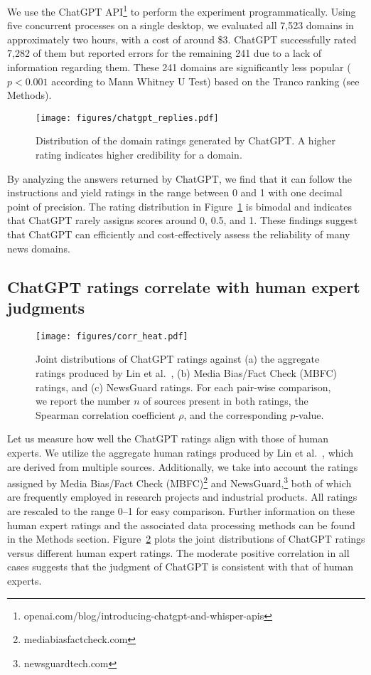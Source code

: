 \documentclass{article}
\begin{document}
We use the ChatGPT API\footnote{openai.com/blog/introducing-chatgpt-and-whisper-apis} to perform the experiment programmatically.
Using five concurrent processes on a single desktop, we evaluated all 7,523 domains in approximately two hours, with a cost of around \$3.
ChatGPT successfully rated 7,282 of them but reported errors for the remaining 241 due to a lack of information regarding them.
These 241 domains are significantly less popular ($p<0.001$ according to Mann Whitney U Test) based on the Tranco ranking (see Methods).

\begin{figure}
    \centering
    \texttt{[image: figures/chatgpt\_replies.pdf]}
    \caption{
    Distribution of the domain ratings generated by ChatGPT.
    A higher rating indicates higher credibility for a domain.
    }
    \label{fig:chatgpt_replies}
\end{figure}

By analyzing the answers returned by ChatGPT, we find that it can follow the instructions and yield ratings in the range between 0 and 1 with one decimal point of precision.
The rating distribution in Figure~\ref{fig:chatgpt_replies} is bimodal and indicates that ChatGPT rarely assigns scores around 0, 0.5, and 1.
These findings suggest that ChatGPT can efficiently and cost-effectively assess the reliability of many news domains.

\subsection{ChatGPT ratings correlate with human expert judgments}

\begin{figure}
    \centering
    \texttt{[image: figures/corr\_heat.pdf]}
    \caption{
    Joint distributions of ChatGPT ratings against (a) the aggregate ratings produced by Lin et al.~\cite{lin2022high}, (b) Media Bias/Fact Check (MBFC) ratings, and (c) NewsGuard ratings.
    For each pair-wise comparison, we report the number $n$ of sources present in both ratings, the Spearman correlation coefficient $\rho$, and the corresponding $p$-value.
    }
    \label{fig:corr_heat}
\end{figure}

Let us measure how well the ChatGPT ratings align with those of human experts.
We utilize the aggregate human ratings produced by Lin et al.~\cite{lin2022high}, which are derived from multiple sources.
Additionally, we take into account the ratings assigned by Media Bias/Fact Check (MBFC)\footnote{mediabiasfactcheck.com} and NewsGuard,\footnote{newsguardtech.com} both of which are frequently employed in research projects and industrial products. 
All ratings are rescaled to the range 0--1 for easy comparison.
Further information on these human expert ratings and the associated data processing methods can be found in the Methods section. 
Figure~\ref{fig:corr_heat} plots the joint distributions of ChatGPT ratings versus different human expert ratings.
The moderate positive correlation in all cases suggests that the judgment of ChatGPT is consistent with that of human experts.
\end{document}
